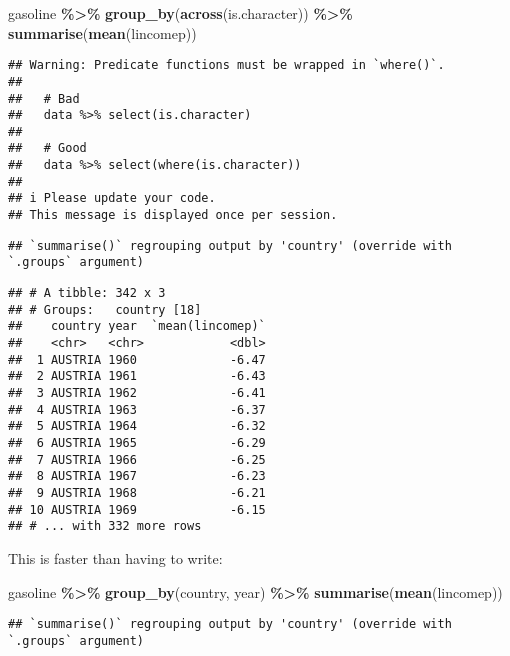 \documentclass[
]{article}
\newenvironment{Shaded}{\begin{snugshade}}{\end{snugshade}}
\newcommand{\KeywordTok}[1]{\textcolor[rgb]{0.13,0.29,0.53}{\textbf{#1}}}
\newcommand{\NormalTok}[1]{#1}
\newcommand{\OperatorTok}[1]{\textcolor[rgb]{0.81,0.36,0.00}{\textbf{#1}}}
\newcommand{\StringTok}[1]{\textcolor[rgb]{0.31,0.60,0.02}{#1}}
\begin{document}
\begin{Shaded}
\begin{Highlighting}[]
\NormalTok{gasoline }\OperatorTok{\%\textgreater{}\%}
\StringTok{  }\KeywordTok{group\_by}\NormalTok{(}\KeywordTok{across}\NormalTok{(is.character)) }\OperatorTok{\%\textgreater{}\%}
\StringTok{  }\KeywordTok{summarise}\NormalTok{(}\KeywordTok{mean}\NormalTok{(lincomep))}
\end{Highlighting}
\end{Shaded}

\begin{verbatim}
## Warning: Predicate functions must be wrapped in `where()`.
## 
##   # Bad
##   data %>% select(is.character)
## 
##   # Good
##   data %>% select(where(is.character))
## 
## i Please update your code.
## This message is displayed once per session.
\end{verbatim}

\begin{verbatim}
## `summarise()` regrouping output by 'country' (override with `.groups` argument)
\end{verbatim}

\begin{verbatim}
## # A tibble: 342 x 3
## # Groups:   country [18]
##    country year  `mean(lincomep)`
##    <chr>   <chr>            <dbl>
##  1 AUSTRIA 1960             -6.47
##  2 AUSTRIA 1961             -6.43
##  3 AUSTRIA 1962             -6.41
##  4 AUSTRIA 1963             -6.37
##  5 AUSTRIA 1964             -6.32
##  6 AUSTRIA 1965             -6.29
##  7 AUSTRIA 1966             -6.25
##  8 AUSTRIA 1967             -6.23
##  9 AUSTRIA 1968             -6.21
## 10 AUSTRIA 1969             -6.15
## # ... with 332 more rows
\end{verbatim}

This is faster than having to write:

\begin{Shaded}
\begin{Highlighting}[]
\NormalTok{gasoline }\OperatorTok{\%\textgreater{}\%}
\StringTok{    }\KeywordTok{group\_by}\NormalTok{(country, year) }\OperatorTok{\%\textgreater{}\%}
\StringTok{    }\KeywordTok{summarise}\NormalTok{(}\KeywordTok{mean}\NormalTok{(lincomep))}
\end{Highlighting}
\end{Shaded}

\begin{verbatim}
## `summarise()` regrouping output by 'country' (override with `.groups` argument)
\end{verbatim}
\end{document}
